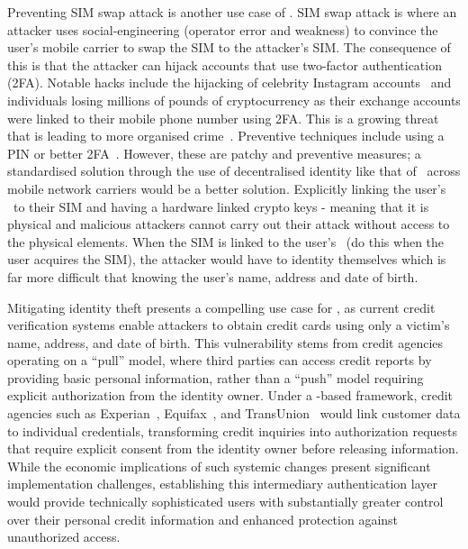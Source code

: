 Preventing SIM swap attack is another use case of \deeid. SIM swap attack is where an attacker uses social-engineering (operator error and weakness) to convince the user's mobile carrier to swap the SIM to the attacker's SIM. The consequence of this is that the attacker can hijack accounts that use two-factor authentication (2FA). Notable hacks include the hijacking of celebrity Instagram accounts~\cite{bell_instagram_nodate} and individuals losing millions of pounds of cryptocurrency as their exchange accounts were linked to their mobile phone number using 2FA. This is a growing threat that is leading to more organised crime~\cite{franceschi-bicchierai_sim_2018}. Preventive techniques include using a PIN or better 2FA~\cite{wire_protect_swimswap}. However, these are patchy and preventive measures; a standardised solution through the use of decentralised identity like that of \deeid\ across mobile network carriers would be a better solution. Explicitly linking the user's \deeid\ to their SIM and having a hardware linked crypto keys - meaning that it is physical and malicious attackers cannot carry out their attack without access to the physical elements. When the SIM is linked to the user's \deeid\ (do this when the user acquires the SIM), the attacker would have to identity themselves which is far more difficult that knowing the user's name, address and date of birth.

Mitigating identity theft presents a compelling use case for \deeid, as current credit verification systems enable attackers to obtain credit cards using only a victim's name, address, and date of birth. This vulnerability stems from credit agencies operating on a ``pull'' model, where third parties can access credit reports by providing basic personal information, rather than a ``push'' model requiring explicit authorization from the identity owner. Under a \deeid-based framework, credit agencies such as Experian~\cite{noauthor_experian_nodate}, Equifax~\cite{noauthor_equifax_nodate}, and TransUnion~\cite{noauthor_transunion_nodate} would link customer data to individual \deeid credentials, transforming credit inquiries into authorization requests that require explicit consent from the identity owner before releasing information. While the economic implications of such systemic changes present significant implementation challenges, establishing this intermediary authentication layer would provide technically sophisticated users with substantially greater control over their personal credit information and enhanced protection against unauthorized access.